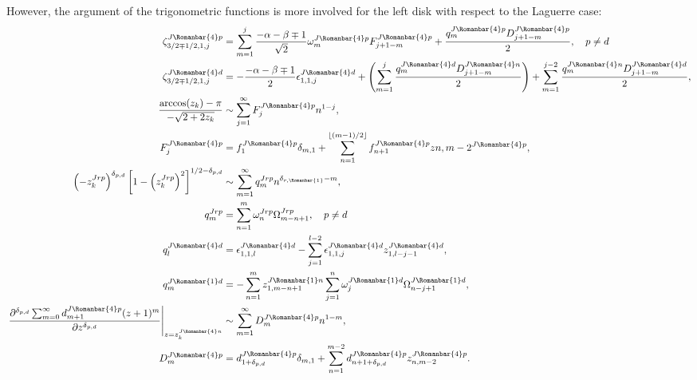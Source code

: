 \documentclass[11pt]{article}
\newcommand{\qj}{J}
\newcommand{\rg}{r}
\newcommand{\rb}{{\scriptsize \Romanbar{1}} }
\newcommand{\rl}{{\scriptsize \Romanbar{4}} }
\newcommand{\pg}{p}
\newcommand{\pn}{n}
\newcommand{\pd}{d}
\numberwithin{equation}{section}
\begin{document}
However, the argument of the trigonometric functions is more involved for the left disk with respect to the Laguerre case:
\begin{align}
	\zeta_{3/2 \mp 1/2, 1, j}^{\qj\rl\pg} & = \sum_{m=1}^j \frac{-\alpha-\beta \mp 1}{\sqrt{2}}\omega_m^{\qj\rl\pg} F_{j+1-m}^{\qj\rl\pg} + \frac{q_m^{\qj\rl\pg} D_{j+1-m}^{\qj\rl\pg} }{2}, \quad \pg \neq \pd \\
	\zeta_{3/2 \mp 1/2, 1, j}^{\qj\rl\pd} & = - \frac{-\alpha-\beta \mp 1}{2} \epsilon_{1,1,j}^{\qj\rl\pd} + \left(\sum_{m=1}^j \frac{q_m^{\qj\rl\pd} D_{j+1-m}^{\qj\rl\pn} }{2}\right) + \sum_{m=1}^{j-2} \frac{q_m^{\qj\rl\pn} D_{j+1-m}^{\qj\rl\pd} }{2}, \\
	\frac{\arccos(z_k)-\pi}{-\sqrt{2+2z_k} } & \sim \sum_{j=1}^\infty F_j^{\qj\rl\pg} n^{1-j}, \\
	F_j^{\qj\rl\pg} & = f_1^{\qj\rl\pg} \delta_{m,1} + \sum_{n=1}^{\lfloor (m-1)/2 \rfloor} f_{n+1}^{\qj\rl\pg} z{n,m-2}^{\qj\rl\pg}, \\
	\left(-z_k^{\qj\rg\pg}\right)^{\delta_{\pg,\pd}} \left[1 -\left(z_k^{\qj\rg\pg}\right)^2\right]^{1/2-\delta_{\pg,\pd}} & \sim \sum_{m=1}^\infty q_m^{\qj\rg\pg} n^{\delta_{\rg,\rb} -m}, \\ %
	q_m^{\qj\rg\pg} & = \sum_{n=1}^m \omega_n^{\qj\rg\pg} \Omega_{m-n+1}^{\qj\rg\pg}, \quad \pg \neq \pd \\
	q_l^{\qj\rl\pd} & = \epsilon_{1,1,l}^{\qj\rl\pd} - \sum_{j=1}^{l-2} \epsilon_{1,1,j}^{\qj\rl\pd} z_{1,l-j-1}^{\qj\rl\pd}, \\ 
	q_m^{\qj\rb\pd} & = -\sum_{n=1}^m z_{1,m-n+1}^{\qj\rb\pn} \sum_{j=1}^n \omega_{j}^{\qj\rb\pd} \Omega_{n-j+1}^{\qj\rb\pd}, \\
	\left. \frac{\partial^{\delta_{\pg,\pd}} \sum_{m=0}^\infty d_{m+1}^{\qj\rl\pg} (z+1)^m }{\partial z^{\delta_{\pg,\pd}}} \right|_{z=z_k^{\qj\rl\pn} }& \sim \sum_{m=1}^\infty D_m^{\qj\rl\pg} n^{1-m}, \\
	D_m^{\qj\rl\pg} & = d_{1+\delta_{\pg,\pd} }^{\qj\rl\pg} \delta_{m,1} + \sum_{n=1}^{m-2} d_{n+1+\delta_{\pg,\pd} }^{\qj\rl\pg} z_{n,m-2}^{\qj\rl\pg}.
\end{align}
\end{document}
